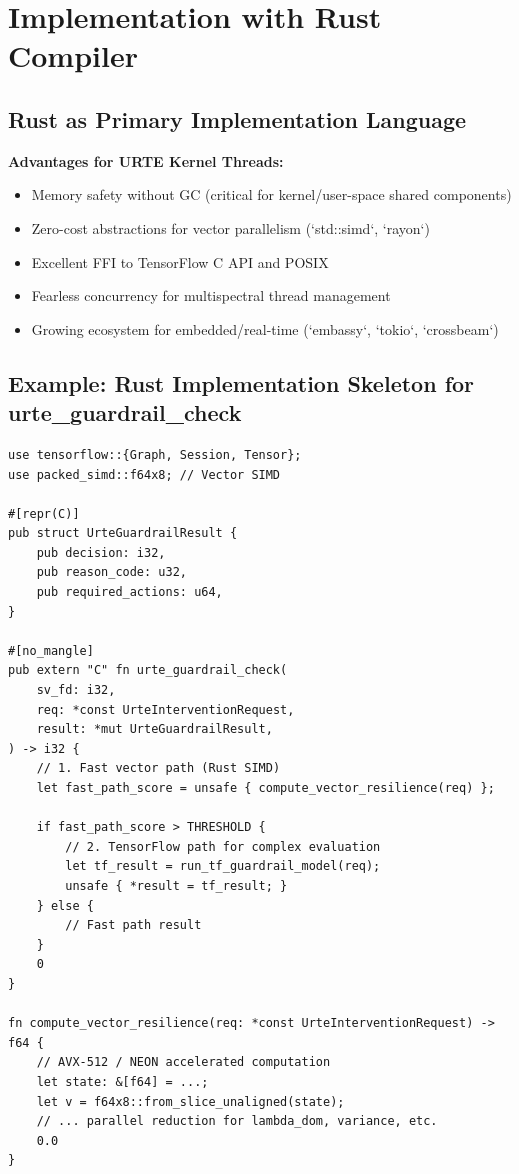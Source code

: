 \documentclass[11pt,a4paper]{report}
\begin{document}
\chapter{Implementation with Rust Compiler}

\section{Rust as Primary Implementation Language}

\textbf{Advantages for URTE Kernel Threads:}
\begin{itemize}
    \item Memory safety without GC (critical for kernel/user-space shared components)
    \item Zero-cost abstractions for vector parallelism (`std::simd`, `rayon`)
    \item Excellent FFI to TensorFlow C API and POSIX
    \item Fearless concurrency for multispectral thread management
    \item Growing ecosystem for embedded/real-time (`embassy`, `tokio`, `crossbeam`)
\end{itemize}

\section{Example: Rust Implementation Skeleton for urte\_guardrail\_check}

\begin{lstlisting}[style=kernelschema, caption={Rust Implementation Outline (Hybrid)}]
use tensorflow::{Graph, Session, Tensor};
use packed_simd::f64x8; // Vector SIMD

#[repr(C)]
pub struct UrteGuardrailResult {
    pub decision: i32,
    pub reason_code: u32,
    pub required_actions: u64,
}

#[no_mangle]
pub extern "C" fn urte_guardrail_check(
    sv_fd: i32,
    req: *const UrteInterventionRequest,
    result: *mut UrteGuardrailResult,
) -> i32 {
    // 1. Fast vector path (Rust SIMD)
    let fast_path_score = unsafe { compute_vector_resilience(req) };

    if fast_path_score > THRESHOLD {
        // 2. TensorFlow path for complex evaluation
        let tf_result = run_tf_guardrail_model(req);
        unsafe { *result = tf_result; }
    } else {
        // Fast path result
    }
    0
}

fn compute_vector_resilience(req: *const UrteInterventionRequest) -> f64 {
    // AVX-512 / NEON accelerated computation
    let state: &[f64] = ...;
    let v = f64x8::from_slice_unaligned(state);
    // ... parallel reduction for lambda_dom, variance, etc.
    0.0
}
\end{lstlisting}
\end{document}
